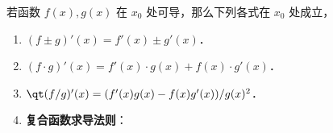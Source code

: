 

若函数 $f(x),g(x)$ 在 $x_0$ 处可导，那么下列各式在 $x_0$ 处成立，

\begin{enumerate}
\item $(f\pm g)'(x)=f'(x)\pm g'(x)$．
\item $(f\cdot g)'(x)=f'(x)\cdot g(x)+f(x)\cdot g'(x)$．
\item $\qt(f/g)'(x)=(f'(x)g(x)-f(x)g'(x))/g(x)^2$．
\item \textbf{复合函数求导法则}：
\end{enumerate}